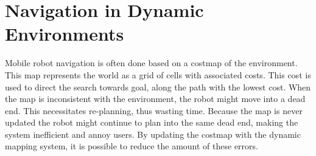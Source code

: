 \section{Navigation in Dynamic Environments}
Mobile robot navigation is often done based on a costmap of the environment. This map represents the world as a grid of cells with associated costs. This cost is used to direct the search towards goal, along the path with the lowest cost. When the map is inconsistent with the environment, the robot might move into a dead end. This necessitates re-planning, thus wasting time. Because the map is never updated the robot might continue to plan into the same dead end, making the system inefficient and annoy users. By updating the costmap with the dynamic mapping system, it is possible to reduce the amount of these errors.